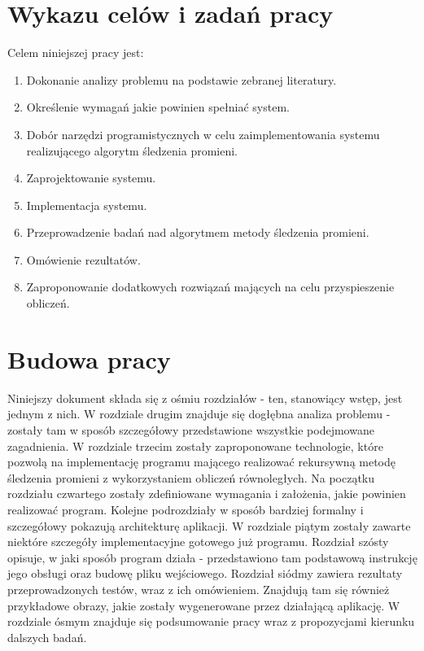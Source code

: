 \section{Wykazu celów i zadań pracy}

Celem niniejszej pracy jest:
\begin{enumerate}
\item Dokonanie analizy problemu na podstawie zebranej literatury.
\item Określenie wymagań jakie powinien spełniać system.
\item Dobór narzędzi programistycznych w celu zaimplementowania systemu realizującego algorytm śledzenia promieni.
\item Zaprojektowanie systemu.
\item Implementacja systemu.
\item Przeprowadzenie badań nad algorytmem metody śledzenia promieni.
\item Omówienie rezultatów.
\item Zaproponowanie dodatkowych rozwiązań mających na celu przyspieszenie obliczeń.
\end{enumerate}

\section{Budowa pracy}

Niniejszy dokument składa się z ośmiu rozdziałów - ten, stanowiący wstęp, jest jednym z nich. W rozdziale drugim znajduje się dogłębna analiza problemu - zostały tam w sposób szczegółowy przedstawione wszystkie podejmowane zagadnienia. W rozdziale trzecim zostały zaproponowane technologie, które pozwolą na implementację programu mającego realizować rekursywną metodę śledzenia promieni z wykorzystaniem obliczeń równoległych. Na początku rozdziału czwartego zostały zdefiniowane wymagania i założenia, jakie powinien realizować program. Kolejne podrozdziały w sposób bardziej formalny i szczegółowy pokazują architekturę aplikacji. W rozdziale piątym zostały zawarte niektóre szczegóły implementacyjne gotowego już programu. Rozdział szósty opisuje, w jaki sposób program działa - przedstawiono tam podstawową instrukcję jego obsługi oraz budowę pliku wejściowego. Rozdział siódmy zawiera rezultaty przeprowadzonych testów, wraz z ich omówieniem. Znajdują tam się również przykładowe obrazy, jakie zostały wygenerowane przez działającą aplikację. W rozdziale ósmym znajduje się podsumowanie pracy wraz z propozycjami kierunku dalszych badań.